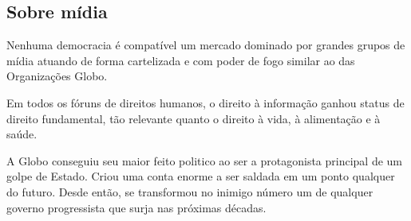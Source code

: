 \subsection{\textbf{Sobre mídia}}

Nenhuma democracia é compatível um mercado dominado por grandes grupos
de mídia atuando de forma cartelizada e com poder de fogo similar ao das
Organizações Globo.

Em todos os fóruns de direitos humanos, o direito à informação ganhou
status de direito fundamental, tão relevante quanto o direito à vida, à
alimentação e à saúde.

A Globo conseguiu seu maior feito politico ao ser a protagonista
principal de um golpe de Estado. Criou uma conta enorme a ser saldada em
um ponto qualquer do futuro. Desde então, se transformou no inimigo
número um de qualquer governo progressista que surja nas próximas
décadas.
